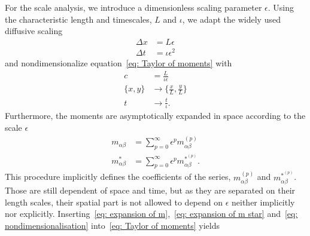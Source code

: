 For the scale analysis, we introduce a dimensionless scaling parameter $\epsilon$.
Using the characteristic length and timescales, $L$ and $\iota$, we adapt the widely used diffusive scaling
\begin{equation}
  \label{eq: nondimensionalisation}
  \begin{aligned}
    \Delta x & = L\epsilon \\
    \Delta t & = \iota\epsilon^2
  \end{aligned}
\end{equation}
and nondimensionalize equation~\eqref{eq: Taylor of moments} with
\begin{equation}
  \label{eq: nondimensionalisation 2}
  \begin{aligned}
    c & = \frac{L}{\iota\epsilon} \\
    \{x, y\} & \rightarrow \{\frac{x}{L}, \frac{y}{L}\} \\
    t & \rightarrow \frac{t}{\iota}.
  \end{aligned}
\end{equation}
Furthermore, the moments are asymptotically expanded in space according to the scale $\epsilon$
\begin{align}
    \label{eq: expansion of m}
    m_{\alpha\beta} & = \sum_{p=0}^{\infty} \epsilon^p m_{\alpha\beta}^{(p)} \\
    \label{eq: expansion of m star}
    m^*_{\alpha\beta} & = \sum_{p=0}^{\infty} \epsilon^p m_{\alpha\beta}^{*^{(p)}}.
\end{align}
This procedure implicitly defines the coefficients of the series, $m_{\alpha\beta}^{(p)}$ and $m_{\alpha\beta}^{*^{(p)}}$.
Those are still dependent of space and time, but as they are separated on their length scales, their spatial part is not allowed to depend on $\epsilon$ neither implicitly nor explicitly.
Inserting~\eqref{eq: expansion of m},~\eqref{eq: expansion of m star} and~\eqref{eq: nondimensionalisation} into~\eqref{eq: Taylor of moments} yields


